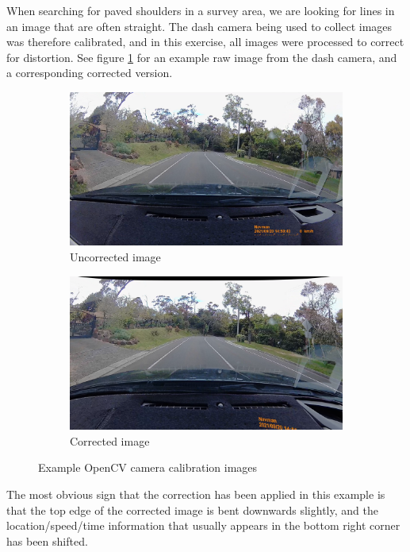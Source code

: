 \documentclass[11pt,twoside]{report}
\begin{document}
When searching for paved shoulders in a survey area, we are looking for lines in an image that are often straight.  The dash camera being used to collect images was therefore calibrated, and in this exercise, all images were processed to correct for distortion.  See figure \ref{fig:008} for an example raw image from the dash camera, and a corresponding corrected version.

\begin{figure}[h]
\centering
\begin{subfigure}{0.45\textwidth}
	\includegraphics[width=\textwidth]{f008_uncorrected.png}
	\caption{Uncorrected image}
\end{subfigure}
\hfill
\begin{subfigure}{0.45\textwidth}
	\includegraphics[width=\textwidth]{f008_corrected.png}
	\caption{Corrected image}
\end{subfigure}

\caption{Example OpenCV camera calibration images}
\label{fig:008}
\end{figure}

The most obvious sign that the correction has been applied in this example is that the top edge of the corrected image is bent downwards slightly, and the location/speed/time information that usually appears in the bottom right corner has been shifted.
\end{document}
